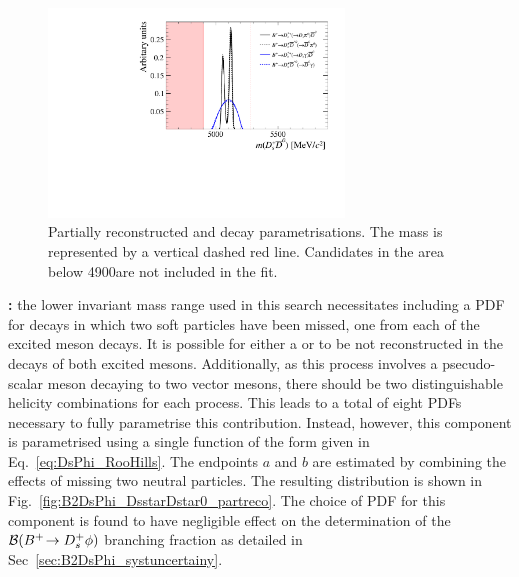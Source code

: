 \begin{figure}[!h]
    \centering
    \includegraphics[width=0.70\textwidth]{figs/B2DsPhi/DsD0_part_reco_Shapes.pdf}
    \caption{Partially reconstructed \decay{\Bp}{\Dsp\Dstarzb} and \decay{\Bp}{\Dssp\Dzb} decay parametrisations. The \Bp mass is represented by a vertical dashed red line. Candidates in the area below 4900\mevcc are not included in the fit.}
    \label{fig:B2DsPhi_DsD0_partreco}   
\end{figure}


\begin{description}

\item \textbf{\decay{\Bp}{\Dssp\Dstarzb}:} the lower invariant mass range used in this search necessitates including a PDF for \decay{\Bp}{\Dssp\Dstarzb} decays in which two soft particles have been missed, one from each of the excited \D meson decays. It is possible for either a \piz or \Pgamma to be not reconstructed in the decays of both excited \D mesons. Additionally, as this process involves a psecudo-scalar meson decaying to two vector mesons, there should be two distinguishable helicity combinations for each process. This leads to a total of eight PDFs necessary to fully parametrise this contribution. Instead, however, this component is parametrised using a single function of the form given in Eq.~\ref{eq:DsPhi_RooHills}. The endpoints $a$ and $b$ are estimated by combining the effects of missing two neutral particles. The resulting distribution is shown in Fig.~\ref{fig:B2DsPhi_DsstarDstar0_partreco}.
The choice of PDF for this component is found to have negligible effect on the determination of the ${\mathcal{B}}({{{B}^+}}\!\rightarrow {\ensuremath{{D}^+_{s}}}\phi)$ branching fraction as detailed in Sec~\ref{sec:B2DsPhi_systuncertainy}.

\end{description}

